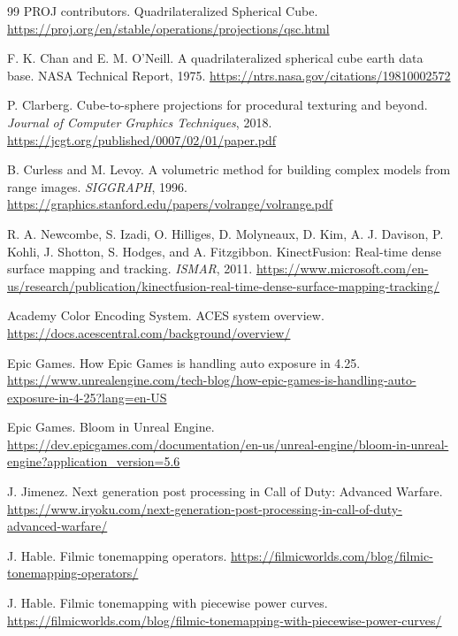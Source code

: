 \documentclass[11pt]{article}
\begin{document}
\begin{thebibliography}{99}
PROJ contributors.
\newblock Quadrilateralized Spherical Cube.
\newblock \url{https://proj.org/en/stable/operations/projections/qsc.html}

F. K. Chan and E. M. O'Neill.
\newblock A quadrilateralized spherical cube earth data base.
\newblock NASA Technical Report, 1975.
\newblock \url{https://ntrs.nasa.gov/citations/19810002572}

P. Clarberg.
\newblock Cube-to-sphere projections for procedural texturing and beyond.
\newblock \emph{Journal of Computer Graphics Techniques}, 2018.
\newblock \url{https://jcgt.org/published/0007/02/01/paper.pdf}

B. Curless and M. Levoy.
\newblock A volumetric method for building complex models from range images.
\newblock \emph{SIGGRAPH}, 1996.
\newblock \url{https://graphics.stanford.edu/papers/volrange/volrange.pdf}

R. A. Newcombe, S. Izadi, O. Hilliges, D. Molyneaux, D. Kim, A. J. Davison, P. Kohli, J. Shotton, S. Hodges, and A. Fitzgibbon.
\newblock KinectFusion: Real-time dense surface mapping and tracking.
\newblock \emph{ISMAR}, 2011.
\newblock \url{https://www.microsoft.com/en-us/research/publication/kinectfusion-real-time-dense-surface-mapping-tracking/}

Academy Color Encoding System.
\newblock ACES system overview.
\newblock \url{https://docs.acescentral.com/background/overview/}

Epic Games.
\newblock How Epic Games is handling auto exposure in 4.25.
\newblock \url{https://www.unrealengine.com/tech-blog/how-epic-games-is-handling-auto-exposure-in-4-25?lang=en-US}

Epic Games.
\newblock Bloom in Unreal Engine.
\newblock \url{https://dev.epicgames.com/documentation/en-us/unreal-engine/bloom-in-unreal-engine?application_version=5.6}

J. Jimenez.
\newblock Next generation post processing in Call of Duty: Advanced Warfare.
\newblock \url{https://www.iryoku.com/next-generation-post-processing-in-call-of-duty-advanced-warfare/}

J. Hable.
\newblock Filmic tonemapping operators.
\newblock \url{https://filmicworlds.com/blog/filmic-tonemapping-operators/}

J. Hable.
\newblock Filmic tonemapping with piecewise power curves.
\newblock \url{https://filmicworlds.com/blog/filmic-tonemapping-with-piecewise-power-curves/}


\end{thebibliography}
\end{document}

